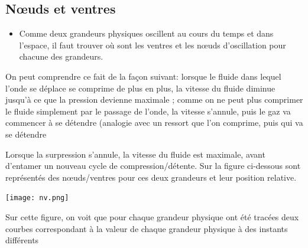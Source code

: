 \documentclass[a4paper, 12pt]{article}
\begin{document}
\subsection{Nœuds et ventres}

\begin{itemize}
\item Comme deux grandeurs physiques oscillent au cours du temps et dans l'espace, il faut trouver où sont les ventres et les nœuds d'oscillation pour chacune des grandeurs.
\end{itemize}

\noindent{}

On peut comprendre ce fait de la façon suivant: lorsque le fluide dans lequel l'onde se déplace se comprime de plus en plus, la vitesse du fluide diminue jusqu'à ce que la pression devienne maximale ; comme on ne peut plus comprimer le fluide simplement par le passage de l'onde, la vitesse s'annule, puis le gaz va commencer à se détendre (analogie avec un ressort que l'on comprime, puis qui va se détendre

Lorsque la surpression s'annule, la vitesse du fluide est maximale, avant d'entamer un nouveau cycle de compression/détente. Sur la figure ci-dessous sont représentés des nœuds/ventres pour ces deux grandeurs et leur position relative.

\begin{center}
 {\texttt{[image: nv.png]}}
\end{center}

Sur cette figure, on voit que pour chaque grandeur physique ont été tracées deux courbes correspondant à la valeur de chaque grandeur physique à des instants différents

\noindent{}
\end{document}

